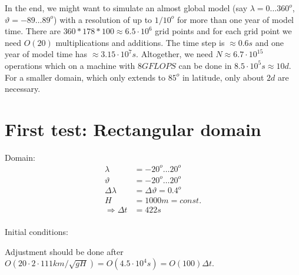 \documentclass[a4paper]{article}
\begin{document}
In the end, we might want to simulate an almost global model 
(say $\lambda=0\ldots360^o$, $\vartheta=-89\ldots89^o$) with a resolution 
of up to $1/10^o$ for more than one year of model time. There are 
$360*178*100\approx 6.5\cdot10^6$ grid points and for each grid point we need $O(20)$ 
multiplications and additions. The time step is $\approx 0.6s$ and one year of model time
has $\approx 3.15\cdot 10^7s$. Altogether, we need $N\approx 6.7\cdot 10^{15}$ operations which
on a machine with $8GFLOPS$ can be done in $8.5\cdot 10^5s\approx 10d$. For a smaller domain, which
only extends to $85^o$ in latitude, only about $2d$ are necessary.


\section{First test: Rectangular domain}

Domain:
\begin{equation}
  \begin{split}
    \lambda & = -20^o \ldots 20^o \\
    \vartheta & = -20^o \ldots 20^o \\
    \Delta \lambda & = \Delta \vartheta = 0.4^o \\
    H & = 1000m = const. \\
    \Rightarrow \Delta t & = 422 s \\
  \end{split}
\end{equation}

Initial conditions:

Adjustment should be done after $O(20 \cdot 2 \cdot 111km / \sqrt{gH}) = 
O(4.5\cdot 10^4s) = O(100) \Delta t$.


%
%
\end{document}
